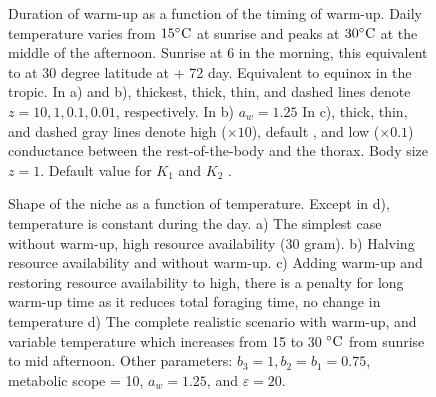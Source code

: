 \vspace{-1.5cm}
%
\begin{figure}[H]
\begin{center}
\caption{
	Duration of warm-up as a function of the timing of warm-up.
	Daily temperature varies from $15 ^{\circ}\rm{C}$ at sunrise  and peaks at $30 ^{\circ}\rm{C}$ at the middle of the afternoon.
	Sunrise at 6 in the morning, this equivalent to at 30 degree latitude at + 72 day. Equivalent to equinox in the tropic.
	In a) and b), thickest, thick, thin, and dashed lines denote  $z = 10, 1, 0.1, 0.01$,  respectively.
	In b) $a_w = 1.25$
	In c), thick, thin, and dashed gray lines denote high ($\times 10$), default , and low ($\times 0.1$) conductance between the rest-of-the-body and the thorax. 
	Body size $z = 1$.
	Default value for $K_1$ and $K_2$ .	
}%
\label{fig4}
\end{center}
\end{figure}
\vspace{-1.5cm}
%
\begin{figure}[H]
\begin{center}
\caption{
	Shape of the niche as a function of temperature.
	Except in d),  temperature is constant during the day.
	a) The simplest case without warm-up, high resource availability (30 gram).
	b) Halving resource availability and without warm-up.
	c) Adding warm-up and  restoring resource availability to high, there is a penalty for long warm-up time as it reduces total foraging time, no change in temperature
	d) The complete realistic scenario with warm-up, and variable temperature  which increases from 15 to 30 $^{\circ} \rm{C}$ from sunrise to mid afternoon.
Other parameters: $b_3 = 1, b_2 = b_1  = 0.75$, metabolic scope = 10, $a_w = 1.25$, and  $\varepsilon = 20$.
}%
\label{fig5}
\end{center}
\end{figure}
%